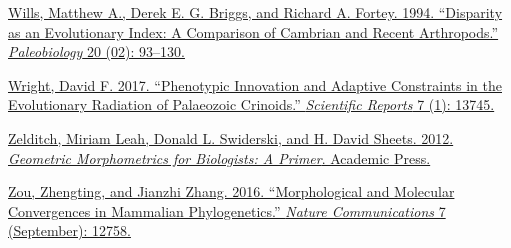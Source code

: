 \href{http://paperpile.com/b/sTGYvp/eZ3F}{Wills, Matthew A., Derek E. G.
Briggs, and Richard A. Fortey. 1994. ``Disparity as an Evolutionary
Index: A Comparison of Cambrian and Recent Arthropods.''
}\href{http://paperpile.com/b/sTGYvp/eZ3F}{\emph{Paleobiology}}\href{http://paperpile.com/b/sTGYvp/eZ3F}{
20 (02): 93--130.}

\href{http://paperpile.com/b/sTGYvp/s33b}{Wright, David F. 2017.
``Phenotypic Innovation and Adaptive Constraints in the Evolutionary
Radiation of Palaeozoic Crinoids.''
}\href{http://paperpile.com/b/sTGYvp/s33b}{\emph{Scientific
Reports}}\href{http://paperpile.com/b/sTGYvp/s33b}{ 7 (1): 13745.}

\href{http://paperpile.com/b/sTGYvp/ZQS9}{Zelditch, Miriam Leah, Donald
L. Swiderski, and H. David Sheets. 2012.
}\href{http://paperpile.com/b/sTGYvp/ZQS9}{\emph{Geometric Morphometrics
for Biologists: A Primer}}\href{http://paperpile.com/b/sTGYvp/ZQS9}{.
Academic Press.}

\href{http://paperpile.com/b/sTGYvp/ZqML}{Zou, Zhengting, and Jianzhi
Zhang. 2016. ``Morphological and Molecular Convergences in Mammalian
Phylogenetics.'' }\href{http://paperpile.com/b/sTGYvp/ZqML}{\emph{Nature
Communications}}\href{http://paperpile.com/b/sTGYvp/ZqML}{ 7
(September): 12758.}

